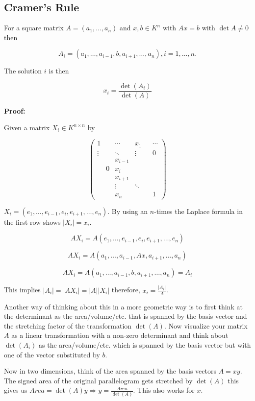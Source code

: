 \subsection{Cramer's Rule}

For a square matrix \(A = (a_1, \dots, a_n)\) and \(x,b \in K^{n}\) with \(Ax = b\) with \(\det A \ne 0\) 
then

\[
A_i = (a_1, \dots, a_{i - 1}, b, a_{i + 1}, \dots, a_n), i = 1,\dots,n.
\]

The solution \(i\) is then

\[
x_i = \frac{\det(A_i)}{\det(A)}
\]

\textbf{Proof:}

Given a matrix \(X_i \in K^{n \times n}\) by

\[
\begin{pmatrix}
	1  &  &\cdots     & x_1    & &\cdots \\
\vdots &  &\ddots     & \vdots & & 0     \\
	   &  &x_{i - 1}  &        & &       \\
	   &0 & x_i 	  &		   & &       \\
	   &  & x_{i + 1} &        & &       \\
	   &  & \vdots    & \ddots & &       \\
	   &  & x_n       &        & &    1   
\end{pmatrix}
\]

\(X_i = (e_1, \dots, e_{i - 1}, e_i, e_{i + 1}, \dots, e_n)\). By using an \(n\)-times the 
Laplace formula in the first row shows \(|X_i| = x_i\).

\[A X_i = A (e_1, \dots, e_{i - 1}, e_i, e_{i + 1}, \dots, e_n)\]

\[A X_i = A (a_1, \dots, a_{i - 1}, Ax, a_{i + 1}, \dots, a_n)\]

\[A X_i = A (a_1, \dots, a_{i - 1}, b, a_{i + 1}, \dots, a_n) = A_i\]

This implies \(|A_i| = |AX_i| = |A||X_i|\) therefore, \(x_i = \frac{|A_i|}{A}\).

\QED

Another way of thinking about this in a more geometric way is to first think at the determinant as 
the area/volume/etc. that is spanned by the basis vector and the stretching factor of the transformation 
\(\det(A)\). Now visualize your matrix \(A\) as a linear transformation with 
a non-zero determinant and think about \(\det(A_i)\) as the area/volume/etc. which is spanned by the 
basis vector but with one of the vector substituted by \(b\).
\vspace{\baselineskip}

Now in two dimensions, think of the area spanned by the basis vectors \(A = xy\). 
The signed area of the original parallelogram gets 
stretched by \(\det(A)\) this gives us \(Area = \det(A)y \Rightarrow y = \frac{Area}{\det(A)}\). This 
also works for \(x\).
